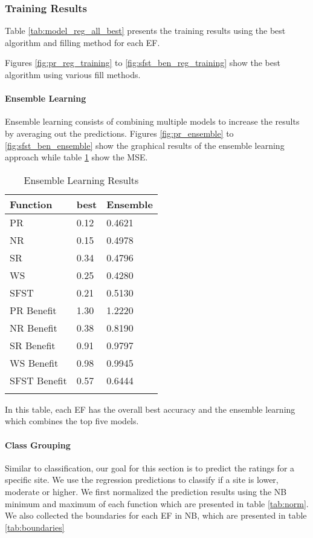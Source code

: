 \documentclass[12pt,letterpaper]{article}
\begin{document}
\subsubsection{Training Results}
Table \ref{tab:model_reg_all_best} presents the training results using the best algorithm and filling method for each EF.

Figures \ref{fig:pr_reg_training} to \ref{fig:sfst_ben_reg_training} show the best algorithm using various fill methods.


\paragraph{Ensemble Learning}
Ensemble learning consists of combining multiple models to increase the results by averaging out the predictions.
Figures \ref{fig:pr_ensemble} to \ref{fig:sfst_ben_ensemble} show the graphical results of the ensemble learning approach while table \ref{tab:ensmeble} show the MSE.


\begin{longtable}{|p{3cm}|p{4cm}|p{4cm}|}
\hline
\textbf{Function} & \textbf{best} & \textbf{Ensemble}  \\ \hline


PR & 0.12 & 0.4621 \\ \hline
NR & 0.15 & 0.4978\\\hline
SR & 0.34 & 0.4796  \\ \hline
WS & 0.25 & 0.4280  \\ \hline
SFST & 0.21 & 0.5130  \\ \hline

PR Benefit & 1.30 & 1.2220 \\ \hline
NR Benefit & 0.38 & 0.8190 \\ \hline
SR Benefit & 0.91 & 0.9797  \\ \hline
WS Benefit & 0.98 & 0.9945  \\ \hline
SFST Benefit & 0.57 & 0.6444  \\ \hline
\caption{Ensemble Learning Results}
\label{tab:ensmeble}
\end{longtable}
In this table, each \ac{EF} has the overall best accuracy and the ensemble learning which combines the top five models.


\paragraph{Class Grouping}
Similar to classification, our goal for this section is to predict the ratings for a specific site.
We use the regression predictions to classify if a site is lower, moderate or higher.
We first normalized the prediction results using the NB minimum and maximum of each function which are presented in table \ref{tab:norm}.
We also collected the boundaries for each \ac{EF} in NB, which are presented in table \ref{tab:boundaries}
\end{document}
